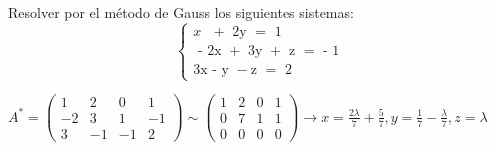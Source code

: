 \documentclass[addpoints,spanish, 12pt,a4paper]{exam}
\begin{document}
\begin{questions}

\question[8] Resolver por el método de Gauss los siguientes sistemas:
		$$\left\{ {\begin{array}{*{20}{c}}
  {x{\text{ }} + {\text{ 2y     }} = {\text{  1}}} \\ 
  {{\text{ - 2x }} + {\text{ 3y }} + {\text{ z }} = {\text{  - 1}}} \\ 
  {{\text{3x  -  y  }} - {\text{z }} = {\text{ 2}}} 
\end{array} } \right.$$
\begin{solution}
$A^*=\left(\begin{matrix}1 & 2 & 0 & 1\\-2 & 3 & 1 & -1\\3 & -1 & -1 & 2\end{matrix}\right)\sim\left(\begin{matrix}1 & 2 & 0 & 1\\0 & 7 & 1 & 1\\0 & 0 & 0 & 0\end{matrix}\right)\to x=\frac{2 \lambda}{7} + \frac{5}{7}, y=\frac{1}{7} - \frac{\lambda}{7}, z=\lambda$ \\
\end{solution}



\end{questions}
\end{document}

